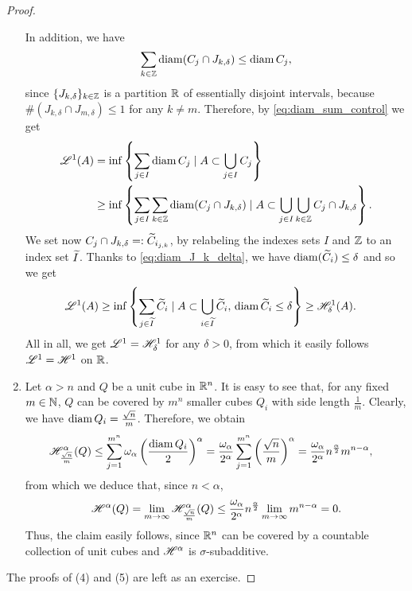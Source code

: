 \begin{proof}
\begin{enumerate}[(1)]
In addition, we have 
\begin{equation} \label{eq:diam_sum_control}
\sum_{k\in\mathbb{Z}} \operatorname{diam}(C_j \cap J_{k,\delta}) \leq \operatorname{diam} C_j,
\end{equation}
since $\{J_{k,\delta}\}_{k \in \mathbb{Z}}$ is a partition $\mathbb{R}$ of essentially disjoint intervals, because $\# (J_{k, \delta} \cap J_{m, \delta}) \le 1$ for any $k \neq m$. Therefore, by \eqref{eq:diam_sum_control} we get
\begin{align*}
\mathscr{L}^{1}(A) & = \inf \left\{ \sum_{j\in I} \operatorname{diam} C_j \mid A \subset
\bigcup_{j\in I} C_j \right\} \\
& \geq \inf \left\{ \sum_{j\in I} \sum_{k\in\mathbb{Z}} \operatorname{diam} (C_j \cap J_{k,\delta}) \mid A \subset
\bigcup_{j\in I} \bigcup_{k\in\mathbb{Z}} C_j\cap J_{k,\delta} \right\}.
\end{align*}
We set now $C_{j} \cap J_{k, \delta} =: \widetilde{ C}_{i_{j, k}}$, by relabeling the indexes sets $I$ and $\mathbb{Z}$ to an index set $\widetilde{ I}$. Thanks to \eqref{eq:diam_J_k_delta}, we have $\operatorname{diam}(\widetilde{ C}_{i}) \le \delta$ and so we get
\begin{align*}
\mathscr{L}^{1}(A) & \ge \inf \left\{ \sum_{j \in \widetilde{ I}} \widetilde{ C}_{i} \mid A \subset \bigcup_{i \in \widetilde{ I}} \widetilde{ C}_{i},\, \operatorname{diam} \widetilde{ C}_i \leq \delta \right\} \geq \mathscr{H}^{1}_\delta(A).
\end{align*}
All in all, we get $\mathscr{L}^{1} = \mathscr{H}^{1}_{\delta}$ for any $\delta > 0$, from which it easily follows $\mathscr{L}^{1} = \mathscr{H}^{1}$ on $\mathbb{R}$.
\item Let $\alpha > n$ and $Q$ be a unit cube in $\mathbb{R}^n$. It is easy to see that, for any fixed $m\in \mathbb{N}$, $Q$ can be covered by $m^{n}$ smaller cubes $Q_i$ with side length $\frac{1}{m}$. Clearly, we have $\operatorname{diam} Q_i
= \frac{\sqrt{n}}{m}$. Therefore, we obtain 
\[
\begin{aligned}
\mathscr{H}^{\alpha}_{\frac{\sqrt{n}}{m}} (Q) 
& \leq \sum_{j=1}^{m^n} \omega_\alpha \left(\frac{\operatorname{diam} Q_i}{2}\right)^\alpha
= \frac{\omega_\alpha}{2^\alpha} \sum_{j=1}^{m^n}
\left(\frac{\sqrt{n}}{m}\right)^\alpha = \frac{\omega_\alpha}{2^\alpha}
n^{\frac{\alpha}{2}} m^{n-\alpha},
\end{aligned}
\]
from which we deduce that, since $n < \alpha$,
\[
\begin{aligned}
\mathscr{H}^{\alpha} (Q) = \lim_{m\to \infty} \mathscr{H}^{\alpha}_{\frac{\sqrt{n}}{m}} (Q) 
\le \frac{\omega_\alpha}{2^\alpha} n^{\frac{\alpha}{2}}
\lim_{m\to \infty} m^{n-\alpha}
= 0.
\end{aligned}
\]
Thus, the claim easily follows, since $\mathbb{R}^n$ can be covered by a countable collection of unit cubes and $\mathscr{H}^{\alpha}$ is $\sigma$-subadditive.
\end{enumerate}
The proofs of (4) and (5) are left as an exercise.
\end{proof}

